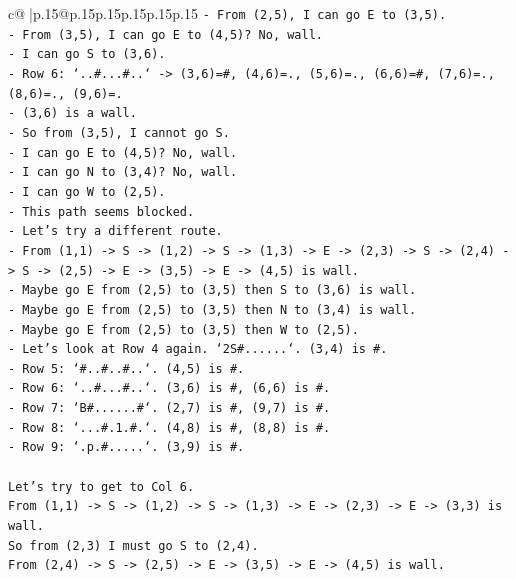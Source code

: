 \documentclass{article}
\begin{document}
{\begin{supertabular}{c@{$\;$}|p{.15\linewidth}@{}p{.15\linewidth}p{.15\linewidth}p{.15\linewidth}p{.15\linewidth}p{.15\linewidth}}
{{{\texttt{{-} From (2,5), I can go E to (3,5).} \\
\texttt{{-} From (3,5), I can go E to (4,5)? No, wall.} \\
\texttt{{-} I can go S to (3,6).} \\
\texttt{{-} Row 6: `..\#...\#..` {-}> (3,6)=\#, (4,6)=., (5,6)=., (6,6)=\#, (7,6)=., (8,6)=., (9,6)=.} \\
\texttt{{-} (3,6) is a wall.} \\
\texttt{{-} So from (3,5), I cannot go S.} \\
\texttt{{-} I can go E to (4,5)? No, wall.} \\
\texttt{{-} I can go N to (3,4)? No, wall.} \\
\texttt{{-} I can go W to (2,5).} \\
\texttt{{-} This path seems blocked.} \\
\texttt{{-} Let's try a different route.} \\
\texttt{{-} From (1,1) {-}> S {-}> (1,2) {-}> S {-}> (1,3) {-}> E {-}> (2,3) {-}> S {-}> (2,4) {-}> S {-}> (2,5) {-}> E {-}> (3,5) {-}> E {-}> (4,5) is wall.} \\
\texttt{{-} Maybe go E from (2,5) to (3,5) then S to (3,6) is wall.} \\
\texttt{{-} Maybe go E from (2,5) to (3,5) then N to (3,4) is wall.} \\
\texttt{{-} Maybe go E from (2,5) to (3,5) then W to (2,5).} \\
\texttt{{-} Let's look at Row 4 again. `2S\#......`. (3,4) is \#.} \\
\texttt{{-} Row 5: `\#..\#..\#..`. (4,5) is \#.} \\
\texttt{{-} Row 6: `..\#...\#..`. (3,6) is \#, (6,6) is \#.} \\
\texttt{{-} Row 7: `B\#......\#`. (2,7) is \#, (9,7) is \#.} \\
\texttt{{-} Row 8: `...\#.1.\#.`. (4,8) is \#, (8,8) is \#.} \\
\texttt{{-} Row 9: `.p.\#.....`. (3,9) is \#.} \\
\\ 
\texttt{Let's try to get to Col 6.} \\
\texttt{From (1,1) {-}> S {-}> (1,2) {-}> S {-}> (1,3) {-}> E {-}> (2,3) {-}> E {-}> (3,3) is wall.} \\
\texttt{So from (2,3) I must go S to (2,4).} \\
\texttt{From (2,4) {-}> S {-}> (2,5) {-}> E {-}> (3,5) {-}> E {-}> (4,5) is wall.} \\
}}}
\end{supertabular}}
\end{document}
